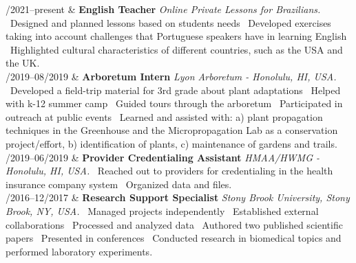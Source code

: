 \documentclass[11pt, a4paper]{article}
\newcommand{\Duration}[2]{\fontsize{10pt}{0}\selectfont #1--#2}
\begin{document}
\begin{EntriesTable}

	\Duration{02/2021}{present}  &
	\textbf{English Teacher}
	\newline
	\textit{Online Private Lessons for Brazilians.}
	\newline
	\textbullet \ Designed and planned lessons based on students needs
	\textbullet \ Developed exercises taking into account challenges that
	Portuguese speakers have in learning English
	\textbullet \ Highlighted cultural characteristics of different countries,
	such as the USA and the UK.
		\\

	\Duration{06/2019}{08/2019}  &
	\textbf{Arboretum Intern}
	\newline
	\textit{Lyon Arboretum - Honolulu, HI, USA.}
	\newline
	\textbullet \ Developed a field-trip material for 3rd grade about plant adaptations
	\textbullet \ Helped with k-12 summer camp
	\textbullet \ Guided tours through the arboretum
	\textbullet \ Participated in outreach at public events
	\textbullet \ Learned and assisted with: a) plant propagation techniques in the Greenhouse and
	the Micropropagation Lab as a conservation project/effort, b) identification of plants, c)
	maintenance of gardens and trails.
	\\

	\Duration{03/2019}{06/2019}  &
	\textbf{Provider Credentialing Assistant}
	\newline
	\textit{HMAA/HWMG - Honolulu, HI, USA.}
	\newline
	\textbullet \ Reached out to providers for credentialing in the health insurance company system
	\textbullet \ Organized data and files.
	\\

	\Duration{08/2016}{12/2017}  &
	\textbf{Research Support Specialist}
	\newline
	\textit{Stony Brook University, Stony Brook, NY, USA.}
	\newline
	\textbullet \ Managed projects independently
	\textbullet \ Established external collaborations
	\textbullet \ Processed and analyzed data
	\textbullet \ Authored two published scientific papers
	\textbullet \ Presented in conferences
	\textbullet\ Conducted research in biomedical topics and performed laboratory experiments.
	\\

\end{EntriesTable}
\end{document}
